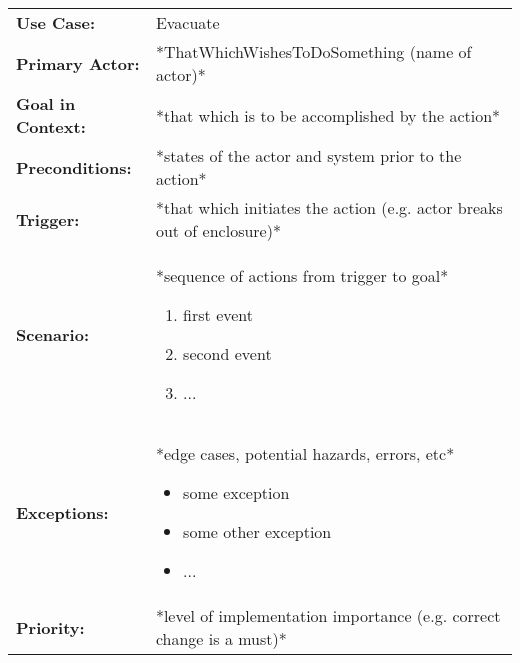 \documentclass[12pt]{article}
\begin{document}
    \begin{table}[H]
    \begin{tabular}{lp{9.9cm}}
        \hline
        \textbf{Use Case:}                     & Evacuate \\

        \textbf{Primary Actor:}                & *ThatWhichWishesToDoSomething (name of actor)*\\

        \textbf{Goal in Context:}              & *that which is to be accomplished by the action* \\

        \textbf{Preconditions:}                & *states of the actor and system prior to the action* \\

        \textbf{Trigger:}                      & *that which initiates the action (e.g. actor breaks out of enclosure)*\\

        \textbf{Scenario:}                     & *sequence of actions from trigger to goal*
                                                 \begin{enumerate}
                                                     \item first event
                                                     \item second event
                                                     \item ...
                                                 \end{enumerate} \\

        \textbf{Exceptions:}                   & *edge cases, potential hazards, errors, etc*
                                                 \begin{itemize}
                                                     \item[] some exception
                                                     \item[] some other exception
                                                     \item[] ...
                                                 \end{itemize}\\

        \textbf{Priority:}                     & *level of implementation importance (e.g. correct change is a must)*\\


\end{tabular}
\end{table}
\end{document}
